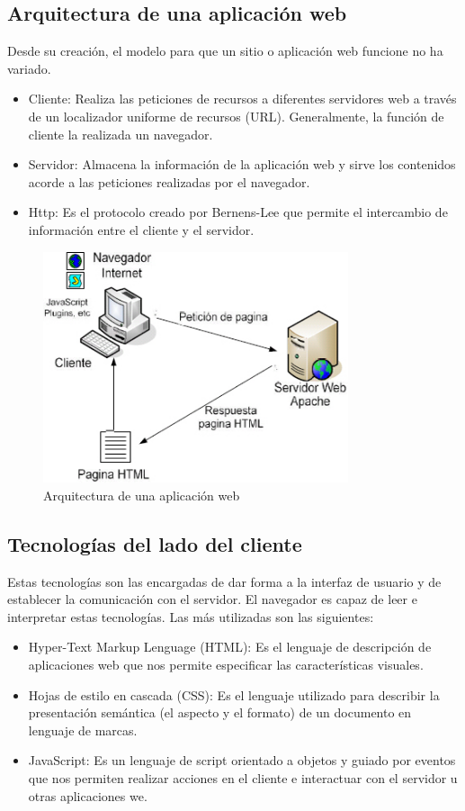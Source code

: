 \subsection{Arquitectura de una aplicación web}
Desde su creación, el modelo para que un sitio o aplicación web funcione no ha variado.
\begin{itemize}
	\item Cliente: Realiza las peticiones de recursos a diferentes servidores web a través de un localizador uniforme de recursos (URL). Generalmente, la función de cliente la realizada un navegador.
	\item Servidor: Almacena la información de la aplicación web y sirve los contenidos acorde a las peticiones realizadas por el navegador.
	\item Http: Es el protocolo creado por Bernens-Lee que permite el intercambio de información entre el cliente y el servidor.
\end{itemize}
\begin{figure}[H]
  \begin{center}
    \includegraphics[width=0.8\textwidth]{figures/arquitecturaweb.jpg}
		\caption{Arquitectura de una aplicación web}
		\label{fig.arquitecturaweb}
		\end{center}
\end{figure}

\subsection{Tecnologías del lado del cliente}
Estas tecnologías son las encargadas de dar forma a la interfaz de usuario y de establecer la comunicación con el servidor. El navegador es capaz de leer e interpretar estas tecnologías. Las más utilizadas son las siguientes:
\begin{itemize}
	\item Hyper-Text Markup Lenguage (HTML): Es el lenguaje de descripción de aplicaciones web que nos permite especificar las características visuales.
	\item Hojas de estilo en cascada (CSS): Es el lenguaje utilizado para describir la presentación semántica (el aspecto y el formato) de un documento en lenguaje de marcas.
	\item JavaScript: Es un lenguaje de script orientado a objetos y guiado por eventos que nos permiten realizar acciones en el cliente e interactuar con el servidor u otras aplicaciones we.
\end{itemize}

